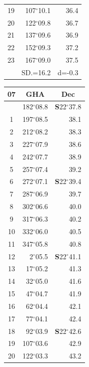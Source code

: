 \documentclass[10pt, a4paper]{report}
\begin{document}
\begin{scriptsize}
\begin{tabular*}{0.2\textwidth}[t]{@{\extracolsep{\fill}}|c|rr|}
19 & 107$^\circ$10.1 & 36.4\\
20 & 122$^\circ$09.8 & 36.7\\
21 & 137$^\circ$09.6 & \raisebox{0.24ex}{\boldmath$\cdot$~\boldmath$\cdot$~~}36.9\\
22 & 152$^\circ$09.3 & 37.2\\
23 & 167$^\circ$09.0 & 37.5\\
\hline
\rule{0pt}{2.4ex} & \multicolumn{1}{c}{SD.=16.2} & \multicolumn{1}{c|}{d=-0.3}\\
\hline
\end{tabular*}\noindent
\begin{tabular*}{0.2\textwidth}[t]{@{\extracolsep{\fill}}|c|rr|}
\hline
\multicolumn{1}{|c|}{\rule{0pt}{2.6ex}\textbf{07}} & \multicolumn{1}{c}{\textbf{GHA}} & \multicolumn{1}{c|}{\textbf{Dec}}\\
\hline\rule{0pt}{2.6ex}\noindent
0 & 182$^\circ$08.8 & \textbf{S}22$^\circ$37.8\\
1 & 197$^\circ$08.5 & 38.1\\
2 & 212$^\circ$08.2 & 38.3\\
3 & 227$^\circ$07.9 & \raisebox{0.24ex}{\boldmath$\cdot$~\boldmath$\cdot$~~}38.6\\
4 & 242$^\circ$07.7 & 38.9\\
5 & 257$^\circ$07.4 & 39.2\\[2Pt]
6 & 272$^\circ$07.1 & \textbf{S}22$^\circ$39.4\\
7 & 287$^\circ$06.9 & 39.7\\
8 & 302$^\circ$06.6 & 40.0\\
9 & 317$^\circ$06.3 & \raisebox{0.24ex}{\boldmath$\cdot$~\boldmath$\cdot$~~}40.2\\
10 & 332$^\circ$06.0 & 40.5\\
11 & 347$^\circ$05.8 & 40.8\\[2Pt]
12 & 2$^\circ$05.5 & \textbf{S}22$^\circ$41.1\\
13 & 17$^\circ$05.2 & 41.3\\
14 & 32$^\circ$05.0 & 41.6\\
15 & 47$^\circ$04.7 & \raisebox{0.24ex}{\boldmath$\cdot$~\boldmath$\cdot$~~}41.9\\
16 & 62$^\circ$04.4 & 42.1\\
17 & 77$^\circ$04.1 & 42.4\\[2Pt]
18 & 92$^\circ$03.9 & \textbf{S}22$^\circ$42.6\\
19 & 107$^\circ$03.6 & 42.9\\
20 & 122$^\circ$03.3 & 43.2\\

\end{tabular*}
\end{scriptsize}
\end{document}
